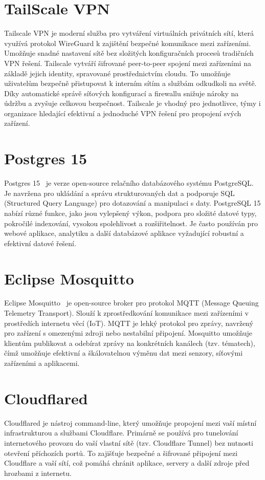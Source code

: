 \section{TailScale VPN}\label{sec:tailscale}
Tailscale VPN je moderní služba pro vytváření virtuálních privátních sítí, která využívá protokol WireGuard k zajištění bezpečné komunikace mezi zařízeními. Umožňuje snadné nastavení sítě bez složitých konfiguračních procesů tradičních VPN řešení. Tailscale vytváří šifrované peer-to-peer spojení mezi zařízeními na základě jejich identity, spravované prostřednictvím cloudu. To umožňuje uživatelům bezpečně přistupovat k interním sítím a službám odkudkoli na světě. Díky automatické správě síťových konfigurací a firewallu snižuje nároky na údržbu a zvyšuje celkovou bezpečnost. Tailscale je vhodný pro jednotlivce, týmy i organizace hledající efektivní a jednoduché VPN řešení pro propojení svých zařízení.

\section{Postgres 15}\label{sec:postgres-15}
Postgres 15~\cite{PostgreSQL15Documentation} je verze open-source relačního databázového systému PostgreSQL. Je navržena pro ukládání a správu strukturovaných dat a podporuje SQL (Structured Query Language) pro dotazování a manipulaci s daty.
PostgreSQL 15 nabízí různé funkce, jako jsou vylepšený výkon, podpora pro složité datové typy, pokročilé indexování, vysokou spolehlivost a rozšiřitelnost.
Je často používán pro webové aplikace, analytiku a další databázové aplikace vyžadující robustní a efektivní datové řešení.

\section{Eclipse Mosquitto}\label{sec:eclipse-mosquitto}
Eclipse Mosquitto~\cite{EclipseMosquitto} je open-source broker pro protokol MQTT (Message Queuing Telemetry Transport).
Slouží k zprostředkování komunikace mezi zařízeními v prostředích internetu věcí (IoT). MQTT je lehký protokol pro zprávy, navržený pro zařízení s omezenými zdroji nebo nestabilní připojení.
Mosquitto umožňuje klientům publikovat a odebírat zprávy na konkrétních kanálech (tzv. tématech), čímž umožňuje efektivní a škálovatelnou výměnu dat mezi senzory, síťovými zařízeními a aplikacemi.

\section{Cloudflared}\label{sec:cloudflared}
Cloudflared je nástroj command-line, který umožňuje propojení mezi vaší místní infrastrukturou a službami Cloudflare.
Primárně se používá pro tunelování internetového provozu do vaší vlastní sítě (tzv. Cloudflare Tunnel) bez nutnosti otevření příchozích portů.
To zajišťuje bezpečné a šifrované připojení mezi Cloudflare a vaší sítí, což pomáhá chránit aplikace, servery a další zdroje před hrozbami z internetu.